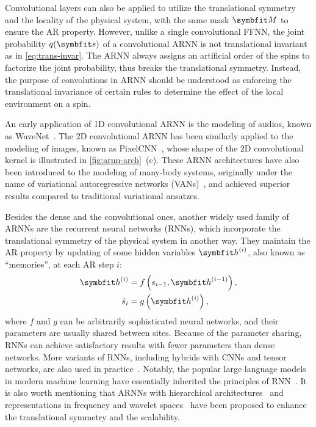 Convolutional layers can also be applied to utilize the translational symmetry and the locality of the physical system, with the same mask $\mM$ to ensure the AR property. However, unlike a single convolutional FFNN, the joint probability $q(\vs)$ of a convolutional ARNN is not translational invariant as in \cref{eq:trans-invar}. The ARNN always assigns an artificial order of the spins to factorize the joint probability, thus breaks the translational symmetry. Instead, the purpose of convolutions in ARNN should be understood as enforcing the translational invariance of certain rules to determine the effect of the local environment on a spin.

An early application of 1D convolutional ARNN is the modeling of audios, known as WaveNet~\cite{oord2016wavenet}. The 2D convolutional ARNN has been similarly applied to the modeling of images, known as PixelCNN~\cite{oord2016pixel}, whose shape of the 2D convolutional kernel is illustrated in \cref{fig:arnn-arch}~(c). These ARNN architectures have also been introduced to the modeling of many-body systems, originally under the name of variational autoregressive networks (VANs)~\cite{wu2019solving}, and achieved superior results compared to traditional variational ansatzes.

Besides the dense and the convolutional ones, another widely used family of ARNNs are the recurrent neural networks (RNNs), which incorporate the translational symmetry of the physical system in another way. They maintain the AR property by updating of some hidden variables $\vh^{(i)}$, also known as ``memories'', at each AR step $i$:
\begin{align}
\vh^{(i)} &= f\left( s_{i - 1}, \vh^{(i - 1)} \right), \label{eq:rnn-update} \\
\hat{s}_i &= g\left( \vh^{(i)} \right), \label{eq:rnn-output}
\end{align}
where $f$ and $g$ can be arbitrarily sophisticated neural networks, and their parameters are usually shared between sites. Because of the parameter sharing, RNNs can achieve satisfactory results with fewer parameters than dense networks. More variants of RNNs, including hybrids with CNNs and tensor networks, are also used in practice~\cite{oord2016pixel, khandoker2023supplementing}. Notably, the popular large language models in modern machine learning have essentially inherited the principles of RNN~\cite{brown2020language}. It is also worth mentioning that ARNNs with hierarchical architectures~\cite{bialas2022hierarchical} and representations in frequency and wavelet spaces~\cite{nash2021generating, mattar2024wavelets} have been proposed to enhance the translational symmetry and the scalability.

